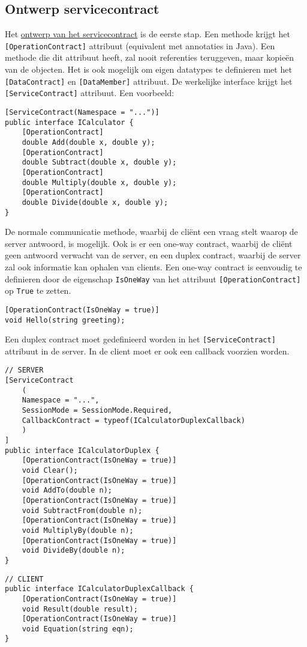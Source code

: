\documentclass{report}
\begin{document}
\subsection{Ontwerp servicecontract}
Het \underline{ontwerp van het servicecontract} is de eerste stap. Een methode krijgt het \texttt{[OperationContract]} attribuut (equivalent met annotaties in Java). Een methode die dit attribuut heeft, zal nooit referenties teruggeven, maar kopieën van de objecten. Het is ook mogelijk om eigen datatypes te definieren met het \texttt{[DataContract]} en \texttt{[DataMember]} attribuut. De werkelijke interface krijgt het \texttt{[ServiceContract]} attribuut. Een voorbeeld:
\begin{lstlisting}[style=csharp]
[ServiceContract(Namespace = "...")]
public interface ICalculator {
	[OperationContract]
	double Add(double x, double y);
	[OperationContract]
	double Subtract(double x, double y);
	[OperationContract]
	double Multiply(double x, double y);
	[OperationContract]
	double Divide(double x, double y);
}
\end{lstlisting}
De normale communicatie methode, waarbij de cliënt een vraag stelt waarop de server antwoord, is mogelijk. Ook is er een one-way contract, waarbij de cliënt geen antwoord verwacht van de server, en een duplex contract, waarbij de server zal ook informatie kan ophalen van clients. Een one-way contract is eenvoudig te definieren door de eigenschap \texttt{IsOneWay} van het attribuut \texttt{[OperationContract]} op \texttt{True} te zetten. 
\begin{lstlisting}[style=csharp]
[OperationContract(IsOneWay = true)]
void Hello(string greeting);
\end{lstlisting}


Een duplex contract moet gedefinieerd worden in het \texttt{[ServiceContract]} attribuut in de server. In de client moet er ook een callback voorzien worden.
\begin{lstlisting}[style=csharp]
	// SERVER
[ServiceContract
	(
	Namespace = "...", 
	SessionMode = SessionMode.Required,
	CallbackContract = typeof(ICalculatorDuplexCallback)
	)
]
public interface ICalculatorDuplex {
	[OperationContract(IsOneWay = true)]
	void Clear();
	[OperationContract(IsOneWay = true)]
	void AddTo(double n);
	[OperationContract(IsOneWay = true)]
	void SubtractFrom(double n);
	[OperationContract(IsOneWay = true)]
	void MultiplyBy(double n);
	[OperationContract(IsOneWay = true)]
	void DivideBy(double n);
}
\end{lstlisting}
\begin{lstlisting}[style=csharp]
	// CLIENT
public interface ICalculatorDuplexCallback {
	[OperationContract(IsOneWay = true)]
	void Result(double result);
	[OperationContract(IsOneWay = true)]
	void Equation(string eqn);
}
\end{lstlisting}
\end{document}
